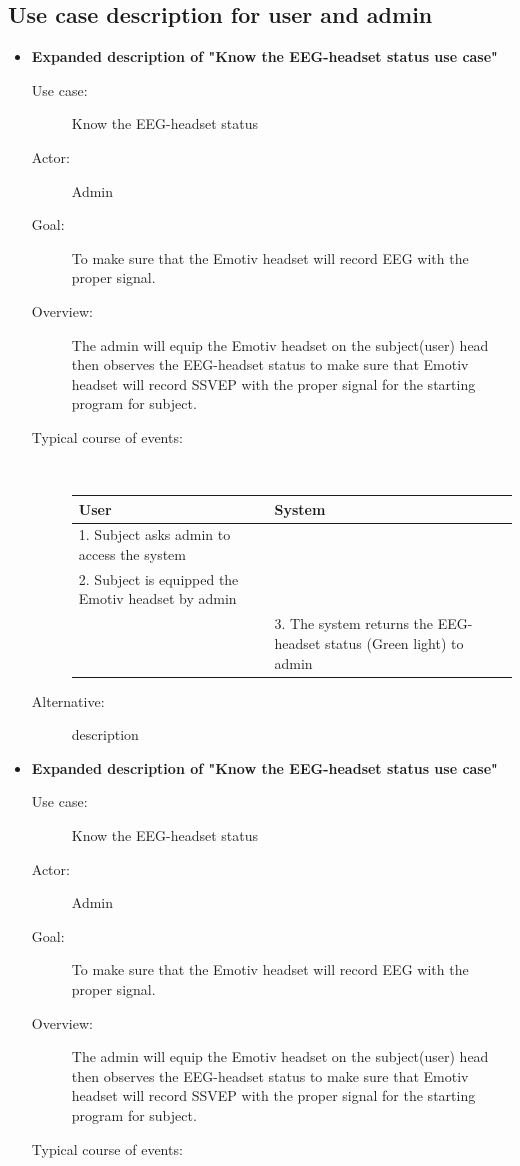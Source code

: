 \subsection{Use case description for user and admin}
\begin{itemize}
\item \textbf{Expanded description of "Know the EEG-headset status
use case" }

\begin{description}
\item [{Use case:}] Know the EEG-headset status 
\item [{Actor:}] Admin 
\item [{Goal:}] To make sure that the Emotiv headset will record EEG with
the proper signal. 
\item [{Overview:}] The admin will equip the Emotiv headset on the subject(user)
head then observes the EEG-headset status to make sure that Emotiv
headset will record SSVEP with the proper signal for the starting
program for subject. 
\item [{Typical course of events:}]~

{
	\centering

	\begin{tabular}{| m{.47\linewidth} | m{.47\linewidth} |}
		
	\hline 
	\textbf{User} & \textbf{System}  \tabularnewline
	\hline 
	1. Subject asks admin to access the system &   \tabularnewline
	\hline 
	2. Subject is equipped the Emotiv headset by admin  &   \tabularnewline
	\hline 
	 & 3. The system returns the EEG-headset status (Green light) to admin \tabularnewline
	 \hline 
	
	\end{tabular}
}
\item[Alternative:] description

\end{description}
\item \textbf{Expanded description of "Know the EEG-headset status
	use case" }

\begin{description}
	\item [{Use case:}] Know the EEG-headset status 
	\item [{Actor:}] Admin 
	\item [{Goal:}] To make sure that the Emotiv headset will record EEG with
	the proper signal. 
	\item [{Overview:}] The admin will equip the Emotiv headset on the subject(user)
	head then observes the EEG-headset status to make sure that Emotiv
	headset will record SSVEP with the proper signal for the starting
	program for subject. 
	\item [{Typical course of events:}]~
	

\end{description}
\end{itemize}
